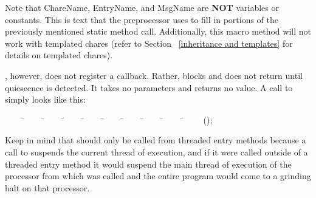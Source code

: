 Note that ChareName, EntryName, and MsgName are {\bf NOT} variables or
constants. This is text that the preprocessor uses to fill in portions of the
previously mentioned static method call.  Additionally, this macro method will
not work with templated chares (refer to Section ~\ref{inheritance and
templates} for details on templated chares).

, however, does not register a callback.  Rather,
 blocks and does not return until quiescence is
detected.  It takes no parameters and returns no value.  A call to
 simply looks like this: 

\begin{tabbing}
~~~~ \=~~~~ \=~~~~ \=~~~~ \=~~~~ \=~~~~ \=~~~~ \=~~~~ \=~~~~ \=~~~~ \kill
\> ();
\end{tabbing}

Keep in mind that  should only be called from threaded
entry methods because a call to  suspends the
current thread of execution, and if it were called outside of a threaded entry
method it would suspend the main thread of execution of the processor from
which  was called and the entire program would come to a grinding
halt on that processor.
